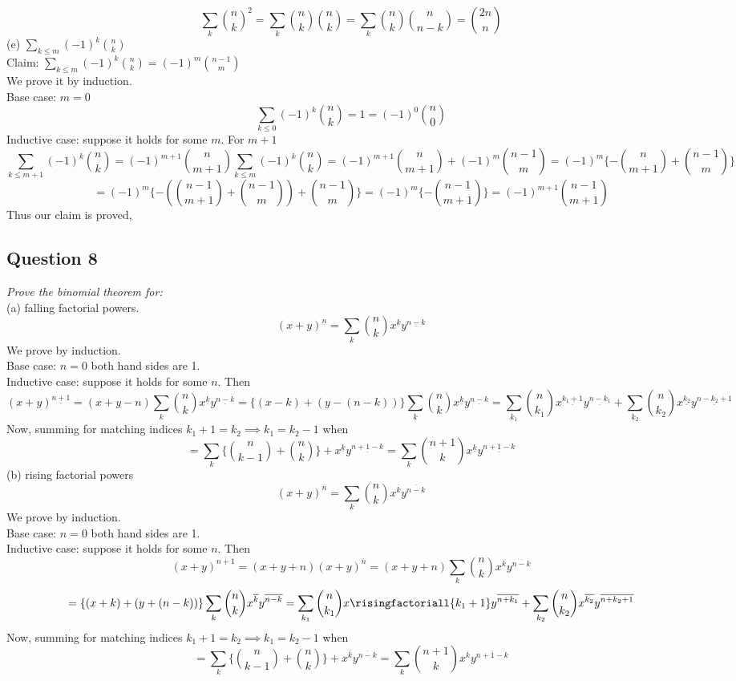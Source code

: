\documentclass{article}
\newcommand{\fallingfactorial}[1]{%
  ^{\underline{#1}}%
}
\newcommand{\risingfactorial}[1]{%
  ^{\overline{#1}}%
}
\begin{document}
$$
\sum_{k} {n \choose k}^2 
= 
\sum_{k} {n \choose k}{n \choose k} 
=
\sum_{k} {n \choose k}{n \choose n-k}
=
{2n \choose n}
$$
\medskip
(e) $\sum_{k \leq m} (-1)^k {n \choose k}$
\\
Claim: $\sum_{k \leq m} (-1)^k {n \choose k} = (-1)^m {n-1 \choose m}$
\\
We prove it by induction.
\\
\medskip
Base case: $m=0$
$$
\sum_{k \leq 0} (-1)^k {n \choose k} = 1 = (-1)^0 {n \choose 0}
$$
Inductive case: suppose it holds for some $m$.
For $m+1$
$$
\sum_{k \leq m + 1} (-1)^k {n \choose k} 
= 
(-1)^{m+1} {n \choose m+1}  \sum_{k \leq m} (-1)^k {n \choose k}  
=  
(-1)^{m+1} {n \choose m+1} + (-1)^m {n-1 \choose m}
= 
(-1)^m \{ - {n \choose m+1} +  {n-1 \choose m}\}
$$
$$
=
(-1)^m \{ - ({n-1 \choose m+1} + {n-1 \choose m}) +  {n-1 \choose m}\}
=
(-1)^m \{-{n-1 \choose m+1}\}
=
(-1)^{m+1} {n-1 \choose m+1}
$$
\medskip
Thus our claim is proved,
\newpage
\subsection{Question 8}
\smallskip
\emph{Prove the binomial theorem for:}
\\
\medskip
(a) falling factorial powers. 
$$
(x+y)\fallingfactorial{n} = \sum_{k} {n \choose k} x\fallingfactorial{k}y\fallingfactorial{n-k}
$$
\medskip
We prove by induction. 
\\
Base case: $n = 0$ both hand sides are 1.
\medskip
\\
Inductive case: suppose it holds for some $n$. Then
$$
(x+y)\fallingfactorial{n+1} 
= 
(x+y-n)\sum_{k} {n \choose k} x\fallingfactorial{k}y\fallingfactorial{n-k}
=
\{(x-k) + (y-(n-k))\}\sum_{k} {n \choose k} x\fallingfactorial{k}y\fallingfactorial{n-k}
=\sum_{k_1} {n \choose k_1 } x\fallingfactorial{k_1 + 1}y\fallingfactorial{n-k_1} 
+
\sum_{k_2} {n \choose k_2 } x\fallingfactorial{k_2}y\fallingfactorial{n-k_2 + 1}
$$
Now, summing for matching indices $k_1 + 1 = k_2 \implies k_1 = k_2 - 1$ when
$$
=
\sum_{k} \{{n \choose k-1 } + {n \choose k}\} +  x\fallingfactorial{k}y\fallingfactorial{n+1-k}
=
\sum_{k} {n+1 \choose k} x\fallingfactorial{k}y\fallingfactorial{n+1-k}
$$
\bigskip
(b) rising factorial powers
$$
(x+y)\risingfactorial{n} = \sum_{k} {n \choose k} x\risingfactorial{k}y\risingfactorial{n-k}
$$
\medskip
We prove by induction. 
\\
Base case: $n = 0$ both hand sides are 1.
\medskip
\\
Inductive case: suppose it holds for some $n$. Then
$$
(x+y)\risingfactorial{n + 1} 
=
(x+y+n)(x+y)\risingfactorial{n}
=
(x+y+n)\sum_{k} {n \choose k} x\risingfactorial{k}y\risingfactorial{n-k}
$$
$$
=
\{(x+k) + (y+(n-k))\}\sum_{k} {n \choose k} x\risingfactorial{k}y\risingfactorial{n-k}
=\sum_{k_1} {n \choose k_1 } x\risingfactoriall{k_1 + 1}y\risingfactorial{n+k_1} 
+
\sum_{k_2} {n \choose k_2 } x\risingfactorial{k_2}y\risingfactorial{n+k_2 + 1}
$$
Now, summing for matching indices $k_1 + 1 = k_2 \implies k_1 = k_2 - 1$ when
$$
=
\sum_{k} \{{n \choose k-1 } + {n \choose k}\} +  x\risingfactorial{k}y\risingfactorial{n-k}
=
\sum_{k} {n+1 \choose k} x\risingfactorial{k}y\risingfactorial{n+1-k}
$$
\newpage
\end{document}
